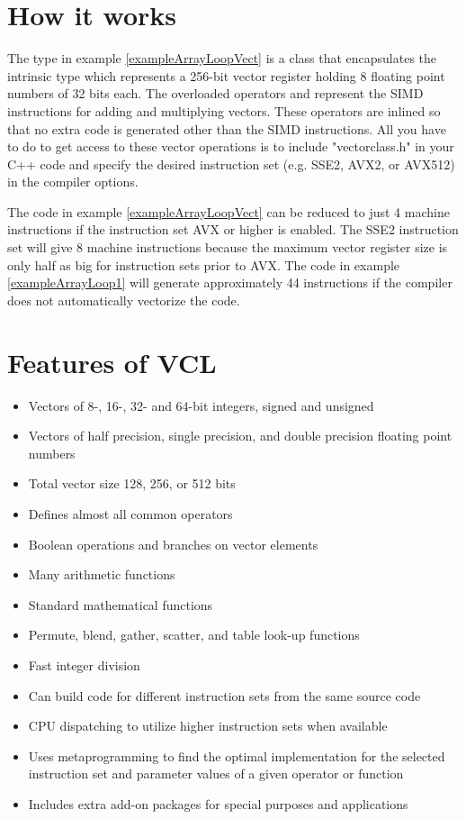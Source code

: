 \documentclass[vcl_manual.tex]{subfiles}
\begin{document}
\section{How it works} \label{HowItWorks}
The type  in example \ref{exampleArrayLoopVect} is a class that encapsulates the intrinsic type 
 which represents a 256-bit vector register holding 8 floating point numbers of 32 bits each. The overloaded operators \codei{+} and \codei{*} represent the SIMD instructions for adding and multiplying vectors. These operators are inlined so that no extra code is generated other than the SIMD instructions. All you have to do to get access to these vector operations is to include "vectorclass.h" in your C++ code and specify the desired instruction set (e.g. SSE2, AVX2, or AVX512) in the compiler options.

The code in example \ref{exampleArrayLoopVect} can be reduced to just 4 machine instructions if the instruction set AVX or higher is enabled. The SSE2 instruction set will give 8 machine instructions because the maximum vector register size is only half as big for instruction sets prior to AVX. The code in example \ref{exampleArrayLoop1} will generate approximately 44 instructions if the compiler does not automatically vectorize the code.

\section{Features of VCL} \label{Features}

\begin{itemize}
\item Vectors of 8-, 16-, 32- and 64-bit integers, signed and unsigned
\item Vectors of half precision, single precision, and double precision floating point numbers
\item Total vector size 128, 256, or 512 bits
\item Defines almost all common operators
\item Boolean operations and branches on vector elements
\item Many arithmetic functions
\item Standard mathematical functions
\item Permute, blend, gather, scatter, and table look-up functions
\item Fast integer division
\item Can build code for different instruction sets from the same source code
\item CPU dispatching to utilize higher instruction sets when available
\item Uses metaprogramming to find the optimal implementation for the selected instruction set and parameter values of a given operator or function
\item Includes extra add-on packages for special purposes and applications
\end{itemize}
\end{document}
